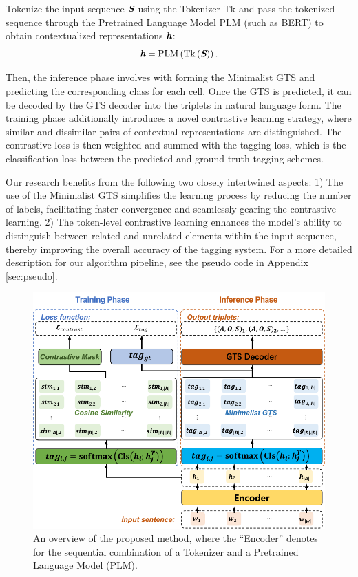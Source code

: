 \documentclass[11pt]{article}
\begin{document}
Tokenize the input sequence \(\textit{\textbf{S}}\) using the Tokenizer \(\mathrm{Tk}\) and pass the tokenized sequence through the Pretrained Language Model \(\mathrm{PLM}\) (such as BERT) to obtain contextualized representations \(\textit{\textbf{h}}\): 
\begin{equation}
\setlength{\abovedisplayskip}{2pt}
\setlength{\belowdisplayskip}{2pt}
\textit{\textbf{h}} = \mathrm{PLM}\left( \mathrm{Tk}\left( \textit{\textbf{S}} \right) \right).
\label{eq:encoder}
\end{equation}

Then, the inference phase involves with forming the Minimalist GTS and predicting the corresponding class for each cell. Once the GTS is predicted, it can be decoded by the GTS decoder into the triplets in natural language form. The training phase additionally introduces a novel contrastive learning strategy, where similar and dissimilar pairs of contextual representations are distinguished. The contrastive loss is then weighted and summed with the tagging loss, which is the classification loss between the predicted and ground truth tagging schemes.

Our research benefits from the following two closely intertwined aspects: 1) The use of the Minimalist GTS simplifies the learning process by reducing the number of labels, facilitating faster convergence and seamlessly gearing the contrastive learning. 2) The token-level contrastive learning enhances the model's ability to distinguish between related and unrelated elements within the input sequence, thereby improving the overall accuracy of the tagging system.
For a more detailed description for our algorithm pipeline, see the pseudo code in Appendix \ref{sec:pseudo}. 



\begin{figure}[ht]
    \centering
    \includegraphics[width=1\linewidth]{fig_framework.pdf}
    \caption{An overview of the proposed method, where the ``Encoder'' denotes for the sequential combination of a Tokenizer and a Pretrained Language Model (PLM). }
    \label{fig:fig_framework.pdf}
\end{figure}
\end{document}
